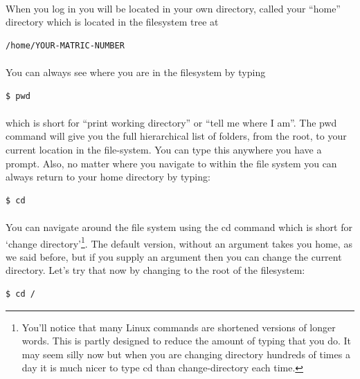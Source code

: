 \documentclass[12pt, a4paper, oneside]{book}
\begin{document}
\paragraph{} When you log in you will be located in your own directory, called your ``home'' directory which is located in the filesystem tree at 

\begin{lstlisting}[style=DOS]
    /home/YOUR-MATRIC-NUMBER
\end{lstlisting}
\paragraph{} You can always see where you are in the filesystem by typing

\begin{lstlisting}[style=DOS]
    $ pwd
\end{lstlisting}
\paragraph{} which is short for ``print working directory'' or ``tell me where I am''. The pwd command will give you the full hierarchical list of folders, from the root, to your current location in the file-system. You can type this anywhere you have a prompt. Also, no matter where you navigate to within the file system you can always return to your home directory by typing:

\begin{lstlisting}[style=DOS]
    $ cd
\end{lstlisting}

\paragraph{} You can navigate around the file system using the cd command which is short for `change directory'\footnote{You'll notice that many Linux commands are shortened versions of longer words. This is partly designed to reduce the amount of typing that you do. It may seem silly now but when you are changing directory hundreds of times a day it is much nicer to type cd than change-directory each time.}. The default version, without an argument takes you home, as we said before, but if you supply an argument then you can change the current directory. Let's try that now by changing to the root of the filesystem:

\begin{lstlisting}[style=DOS]
    $ cd /
\end{lstlisting}
\end{document}
